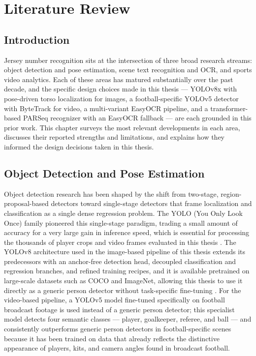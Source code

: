 \chapter{Literature Review}
\label{ch:literature}

\section{Introduction}

Jersey number recognition sits at the intersection of three broad
research streams: object detection and pose estimation, scene text
recognition and OCR, and sports video analytics. Each of these areas
has matured substantially over the past decade, and the specific design
choices made in this thesis --- YOLOv8x with pose-driven torso
localization for images, a football-specific YOLOv5 detector with
ByteTrack for video, a multi-variant EasyOCR pipeline, and a
transformer-based PARSeq recognizer with an EasyOCR fallback --- are
each grounded in this prior work. This chapter surveys the most
relevant developments in each area, discusses their reported strengths
and limitations, and explains how they informed the design decisions
taken in this thesis.

\section{Object Detection and Pose Estimation}

Object detection research has been shaped by the shift from two-stage,
region-proposal-based detectors toward single-stage detectors that
frame localization and classification as a single dense regression
problem. The YOLO (You Only Look Once) family pioneered this
single-stage paradigm, trading a small amount of accuracy for a very
large gain in inference speed, which is essential for processing the
thousands of player crops and video frames evaluated in this thesis
\cite{redmon2016yolo}. The YOLOv8 architecture used in the image-based
pipeline of this thesis extends its predecessors with an anchor-free
detection head, decoupled classification and regression branches, and
refined training recipes, and it is available pretrained on large-scale
datasets such as COCO and ImageNet, allowing this thesis to use it
directly as a generic person detector without task-specific
fine-tuning \cite{ultralytics2023yolov8,deng2009imagenet}. For the
video-based pipeline, a YOLOv5 model fine-tuned specifically on
football broadcast footage is used instead of a generic person
detector; this specialist model detects four semantic classes ---
player, goalkeeper, referee, and ball --- and consistently outperforms
generic person detectors in football-specific scenes because it has
been trained on data that already reflects the distinctive appearance
of players, kits, and camera angles found in broadcast football.

